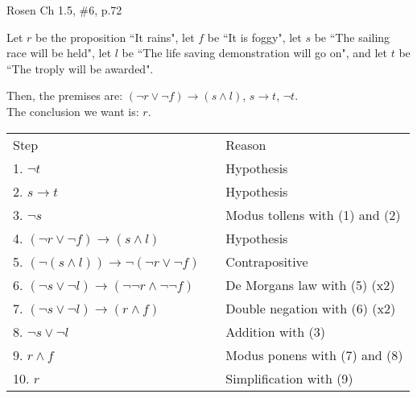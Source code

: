 \documentclass[12pt]{exam}
\begin{document}
\begin{questions}
\question[9] Rosen Ch 1.5, \#6, p.72
    \begin{solution}
    Let $r$ be the proposition ``It rains", let $f$ be ``It is foggy",
    let $s$ be ``The sailing race will be held", let $l$ be ``The life
    saving demonstration will go on", and let $t$ be ``The troply will
    be awarded".

    Then, the premises are: $(\neg r \vee \neg f) \rightarrow (s \wedge l)$, $s \rightarrow t$, $\neg t$. \\
    The conclusion we want is: $r$.

    \begin{tabular}{lll}
        Step    & \hspace{0.2in} & Reason \\
        1. $\neg t$                 &       & Hypothesis \\
        2. $s \rightarrow t$        &       & Hypothesis \\
        3. $\neg s$                 &       & Modus tollens with (1) and (2) \\
        4. $(\neg r \vee \neg f) \rightarrow (s \wedge l)$  &   & Hypothesis \\
        5. $(\neg(s \wedge l)) \rightarrow \neg(\neg r \vee \neg f)$    & & Contrapositive \\
        6. $(\neg s \vee \neg l) \rightarrow (\neg \neg r \wedge \neg \neg f)$ & & De Morgans law with (5) (x2) \\
        7. $(\neg s \vee \neg l) \rightarrow (r \wedge f)$  & & Double negation with (6) (x2) \\
        8. $\neg s \vee \neg l$     &       & Addition with (3) \\
        9. $r \wedge f$             &       & Modus ponens with (7) and (8) \\
        10. $r$                     &       & Simplification with (9)
    \end{tabular}
    \end{solution}



\end{questions}
\end{document}
